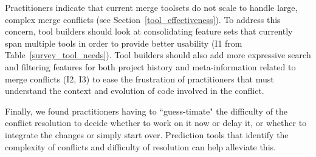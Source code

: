 Practitioners indicate that current merge toolsets do not scale to handle large, complex merge conflicts (see Section~\ref{tool_effectiveness}).
To address this concern, tool builders should look at consolidating feature sets that currently span multiple tools in order to provide better usability (I1 from Table~\ref{survey_tool_needs}).
Tool builders should also add more expressive search and filtering features for both project history and meta-information related to merge conflicts (I2, I3) to ease the frustration of practitioners that must understand the context and evolution of code involved in the conflict.

Finally, we found practitioners having to ``guess-timate" the difficulty of the conflict resolution to decide whether to work on it now or delay it, or whether to integrate the changes or simply start over. 
Prediction tools that identify the complexity of conflicts and difficulty of resolution can help alleviate this.